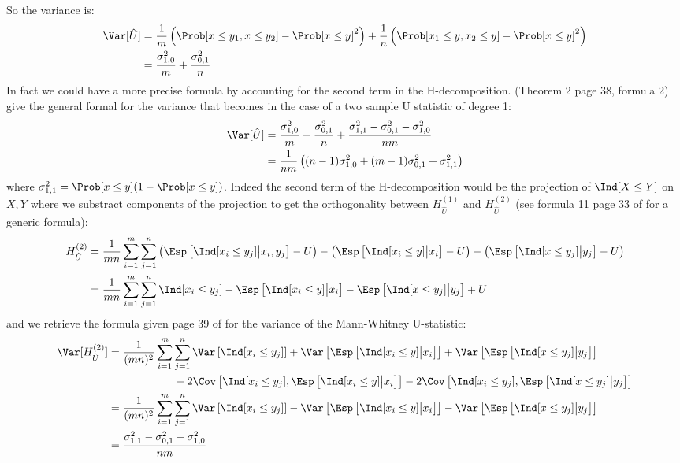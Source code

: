 \documentclass[12pt]{article}
\begin{document}
So the variance is:
\begin{align*}
\Var[\hat{U}] &= \frac{1}{m} \left(\Prob[x \leq y_1, x \leq y_2] - \Prob[x \leq y]^2 \right) + \frac{1}{n} \left(\Prob[x_1 \leq y, x_2 \leq y] - \Prob[x \leq y]^2 \right) \\
&= \frac{\sigma^2_{1,0}}{m} + \frac{\sigma^2_{0,1}}{n}
\end{align*}
In fact we could have a more precise formula by accounting for the
second term in the H-decomposition. \cite{lee1990u} (Theorem 2 page 38, formula 2)
give the general formal for the variance that becomes in the case of a two sample U statistic of degree 1:
\begin{align*}
\Var[\hat{U}] &= \frac{\sigma^2_{1,0}}{m} + \frac{\sigma^2_{0,1}}{n} + \frac{\sigma^2_{1,1}-\sigma^2_{0,1}-\sigma^2_{1,0}}{nm} \\
&= \frac{1}{nm} \left((n-1)\sigma^2_{1,0} + (m-1)\sigma^2_{0,1} + \sigma^2_{1,1} \right) 
\end{align*}
where \(\sigma^2_{1,1} = \Prob[x \leq y](1-\Prob[x \leq y])\). Indeed the second
term of the H-decomposition would be the projection of \(\Ind[X \leq
Y]\) on \(X,Y\) where we substract components of the \Hajek
projection to get the orthogonality between \(H_{\hat{U}}^{(1)}\) and
\(H_{\hat{U}}^{(2)}\) (see formula 11 page 33 of \cite{lee1990u} for a
generic formula):
\begin{align*}
H_{\hat{U}}^{(2)} &= \frac{1}{mn} \sum_{i=1}^m \sum_{j=1}^n \left(\Esp\left[ \Ind[x_i \leq y_j] \big| x_i,y_j\right] - U\right) - \left(\Esp\left[ \Ind[x_i \leq y] \big| x_i\right] - U\right) - \left(\Esp\left[ \Ind[x \leq y_j] \big| y_j\right] - U\right) \\
&= \frac{1}{mn} \sum_{i=1}^m \sum_{j=1}^n \Ind[x_i \leq y_j] - \Esp\left[ \Ind[x_i \leq y] \big| x_i\right] - \Esp\left[ \Ind[x \leq y_j] \big| y_j\right] + U
\end{align*}
and we retrieve the formula given page 39 of \cite{lee1990u} for the variance of the Mann-Whitney U-statistic:
\begin{align*}
\Var[H_{\hat{U}}^{(2)}] 
&= \frac{1}{(mn)^2} \sum_{i=1}^m \sum_{j=1}^n \Var\left[\Ind[x_i \leq y_j]\right] + \Var\left[\Esp\left[ \Ind[x_i \leq y] \big| x_i\right]\right] + \Var\left[\Esp\left[ \Ind[x \leq y_j] \big| y_j\right]\right] \\
& \qquad \qquad \qquad -2 \Cov\left[\Ind[x_i \leq y_j],\Esp\left[ \Ind[x_i \leq y] \big| x_i\right]\right] -2 \Cov\left[\Ind[x_i \leq y_j],\Esp\left[ \Ind[x \leq y_j] \big| y_j\right]\right] \\
&= \frac{1}{(mn)^2} \sum_{i=1}^m \sum_{j=1}^n \Var\left[\Ind[x_i \leq y_j]\right] - \Var\left[\Esp\left[ \Ind[x_i \leq y] \big| x_i\right]\right] - \Var\left[\Esp\left[ \Ind[x \leq y_j] \big| y_j\right]\right] \\
&= \frac{\sigma^2_{1,1}-\sigma^2_{0,1}-\sigma^2_{1,0}}{nm}
\end{align*}
\end{document}
